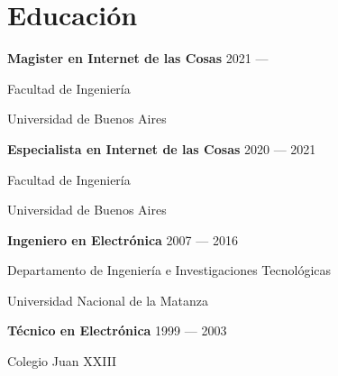 \section{Educación}
\parbox[t][][t]{\linewidth}{
	\parbox{\linewidth}{\textbf{Magister en Internet de las Cosas} \hfill {{2021 --- \phantom{2022}}}}
	\parbox{\linewidth}{{Facultad de Ingeniería}}
	\parbox{\linewidth}{{Universidad de Buenos Aires}}
	\smallskip
	\smallskip
}

\parbox[t][][t]{\linewidth}{
	\parbox{\linewidth}{\textbf{Especialista en Internet de las Cosas} \hfill {{2020 --- 2021}}}
	\parbox{\linewidth}{{Facultad de Ingeniería}}
	\parbox{\linewidth}{{Universidad de Buenos Aires}}
	\smallskip
	\smallskip
}

\parbox[t][][t]{\linewidth}{
	\parbox{\linewidth}{\textbf{Ingeniero en Electrónica} \hfill {{2007 --- 2016}}}
	\parbox{\linewidth}{{Departamento de Ingeniería e Investigaciones Tecnológicas}}
	\parbox{\linewidth}{{Universidad Nacional de la Matanza}}
	\smallskip
	\smallskip
}

\parbox[t][][t]{\linewidth}{
	\parbox{\linewidth}{\textbf{Técnico en Electrónica} \hfill {{1999 --- 2003}}}
	\parbox{\linewidth}{{Colegio Juan XXIII}}
	\smallskip
	\smallskip
}

